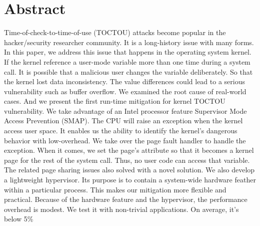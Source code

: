 \section{Abstract}

Time-of-check-to-time-of-use (TOCTOU) attacks become popular in the hacker/security researcher community. It is a long-history issue with many forms. In this paper, we address this issue that happens in the operating system kernel. If the kernel reference a user-mode variable more than one time during a system call. It is possible that a malicious user changes the variable deliberately. So that the kernel lost data inconsistency. The value differences could lead to a serious vulnerability such as buffer overflow.  We examined the root cause of real-world cases. And we present the first run-time mitigation for kernel TOCTOU vulnerability. We take advantage of an Intel processor feature Supervisor Mode Access Prevention (SMAP). The CPU will raise an exception when the kernel access user space. It enables us the ability to identify the kernel's dangerous behavior with low-overhead. We take over the page fault handler to handle the exception. When it comes, we set the page's attribute so that it becomes a kernel page for the rest of the system call.  Thus, no user code can access that variable. The related page sharing issues also solved with a novel solution. We also develop a lightweight hypervisor. Its purpose is to contain a system-wide hardware feather within a particular process.  This makes our mitigation more flexible and practical. Because of the hardware feature and the hypervisor, the performance overhead is modest. We test it with non-trivial applications. On average, it's below 5\%
